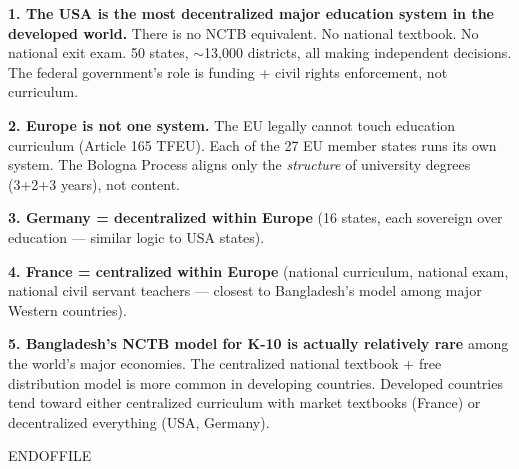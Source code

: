 	\textbf{1. The USA is the most decentralized major education system in the developed world.} There is no NCTB equivalent. No national textbook. No national exit exam. 50 states, $\sim$13,000 districts, all making independent decisions. The federal government's role is funding + civil rights enforcement, not curriculum.

	\textbf{2. Europe is not one system.} The EU legally cannot touch education curriculum (Article 165 TFEU). Each of the 27 EU member states runs its own system. The Bologna Process aligns only the \textit{structure} of university degrees (3+2+3 years), not content.

	\textbf{3. Germany = decentralized within Europe} (16 states, each sovereign over education --- similar logic to USA states).

	\textbf{4. France = centralized within Europe} (national curriculum, national exam, national civil servant teachers --- closest to Bangladesh's model among major Western countries).

	\textbf{5. Bangladesh's NCTB model for K-10 is actually relatively rare} among the world's major economies. The centralized national textbook + free distribution model is more common in developing countries. Developed countries tend toward either centralized curriculum with market textbooks (France) or decentralized everything (USA, Germany).


ENDOFFILE
